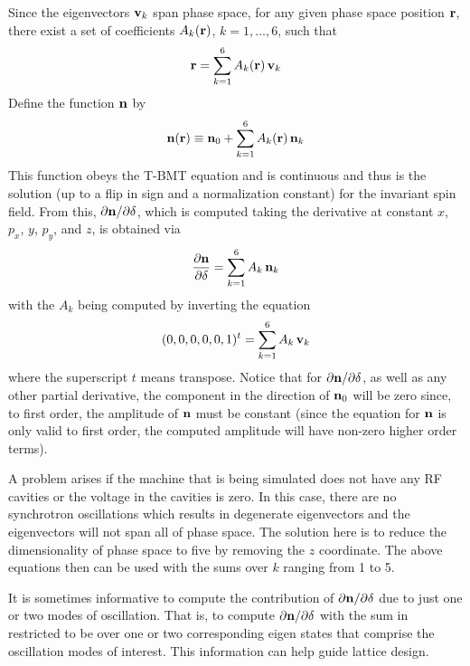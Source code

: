 Since the eigenvectors ${\bf v}_k$ span phase space, for any given phase space position ${\bf r}$, there
exist a set of coefficients $A_k({\bf r})$, $k = 1, \ldots, 6$, such that
\begin{equation}
  {\bf r} = \sum_{k = 1}^6 A_k({\bf r}) \, {\bf v}_k
\end{equation}
Define the function ${\bf n}$ by
\begin{equation}
  {\bf n}({\bf r}) \equiv {\bf n}_0 + \sum_{k = 1}^6 A_k({\bf r}) \, {\bf n}_k
  \label{nrn0}
\end{equation}
This function obeys the T-BMT equation and is continuous and thus is the solution (up to a flip in
sign and a normalization constant) for the invariant spin field. From this, ${\partial
{\bf n}}/\partial \delta$, which is computed taking the derivative at constant $x$, $p_x$, $y$, $p_y$,
and $z$, is obtained via
\begin{equation}
  \frac{\partial {\bf n}}{\partial \delta} = 
  \sum_{k = 1}^6 A_k \, {\bf n}_k
  \label{ndan}
\end{equation}
with the $A_k$ being computed by inverting the equation
\begin{equation}
  (0, 0, 0, 0, 0, 1)^t = \sum_{k = 1}^6 A_k \, {\bf v}_k
  \label{000001}
\end{equation}
where the superscript $t$ means transpose. Notice that for ${\partial {\bf n}}/\partial \delta$, as
well as any other partial derivative, the component in the direction of ${\bf n}_0$ will be zero since,
to first order, the amplitude of ${\bf n}$ must be constant (since the equation for ${\bf n}$ is only
valid to first order, the computed amplitude will have non-zero higher order terms).

A problem arises if the machine that is being simulated does not have any RF cavities or the voltage
in the cavities is zero. In this case, there are no synchrotron oscillations which results in
degenerate eigenvectors and the eigenvectors will not span all of phase space. The solution here
is to reduce the dimensionality of phase space to five by removing the $z$ coordinate. The above
equations then can be used with the sums over $k$ ranging from 1 to 5. 

It is sometimes informative to compute the contribution of ${\partial {\bf n}}/\partial \delta$ due to
just one or two modes of oscillation. That is, to compute ${\partial {\bf n}}/\partial \delta$ with the sum in
 restricted to be over one or two corresponding eigen states that comprise the oscillation
modes of interest. This information can help guide lattice design.


